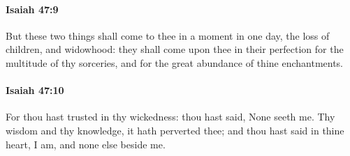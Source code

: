 		\paragraph{Isaiah 47:9} %
			\label{ISAIAH-47-9}

			But these two things shall come to thee in a moment in one day, the loss of children, and widowhood: they shall come upon thee in their perfection for the multitude of thy sorceries, and for the great abundance of thine enchantments.


		\paragraph{Isaiah 47:10} %
			\label{ISAIAH-47-10}

			For thou hast trusted in thy wickedness: thou hast said, None seeth me. Thy wisdom and thy knowledge, it hath perverted thee; and thou hast said in thine heart, I am, and none else beside me.

